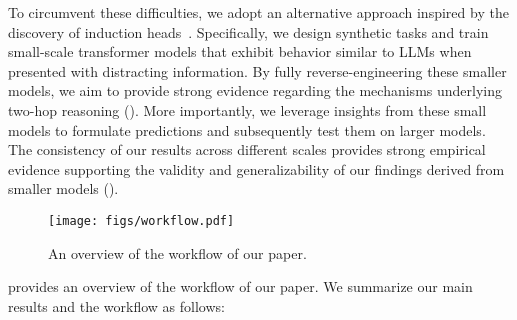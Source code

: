 To circumvent these difficulties, we adopt an alternative approach inspired by the discovery of induction heads~\citep{elhage2021mathematical}. 
Specifically, we design synthetic tasks and train small-scale transformer models that exhibit behavior similar to LLMs when presented with distracting information. 
By fully reverse-engineering these smaller models, we aim to  provide strong evidence regarding the mechanisms underlying two-hop reasoning (). 
More importantly, we leverage insights from these small models to formulate predictions and subsequently test them on larger models. 
The consistency of our results across different scales provides strong empirical evidence supporting the validity and generalizability of our findings derived from smaller models (). 

\begin{figure}
    \centering
    \texttt{[image: figs/workflow.pdf]}
    \caption{An overview of the workflow of our paper.}
    \label{fig:enter-label}
\end{figure}

 provides an overview of the workflow of our paper. We summarize our main results and the workflow as follows:

